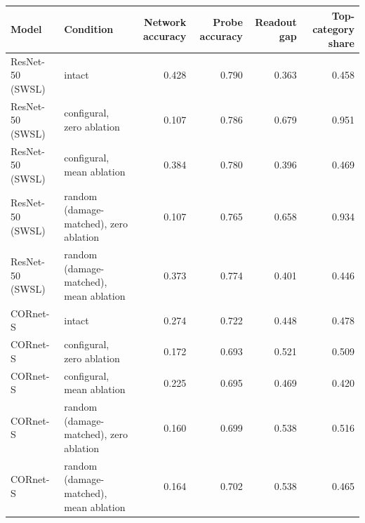 \begin{tabular}{llrrrr}
\hline
Model & Condition & Network accuracy & Probe accuracy & Readout gap & Top-category share \\
\hline
ResNet-50 (SWSL) & intact & 0.428 & 0.790 & 0.363 & 0.458 \\
ResNet-50 (SWSL) & configural, zero ablation & 0.107 & 0.786 & 0.679 & 0.951 \\
ResNet-50 (SWSL) & configural, mean ablation & 0.384 & 0.780 & 0.396 & 0.469 \\
ResNet-50 (SWSL) & random (damage-matched), zero ablation & 0.107 & 0.765 & 0.658 & 0.934 \\
ResNet-50 (SWSL) & random (damage-matched), mean ablation & 0.373 & 0.774 & 0.401 & 0.446 \\
CORnet-S & intact & 0.274 & 0.722 & 0.448 & 0.478 \\
CORnet-S & configural, zero ablation & 0.172 & 0.693 & 0.521 & 0.509 \\
CORnet-S & configural, mean ablation & 0.225 & 0.695 & 0.469 & 0.420 \\
CORnet-S & random (damage-matched), zero ablation & 0.160 & 0.699 & 0.538 & 0.516 \\
CORnet-S & random (damage-matched), mean ablation & 0.164 & 0.702 & 0.538 & 0.465 \\
\hline
\end{tabular}